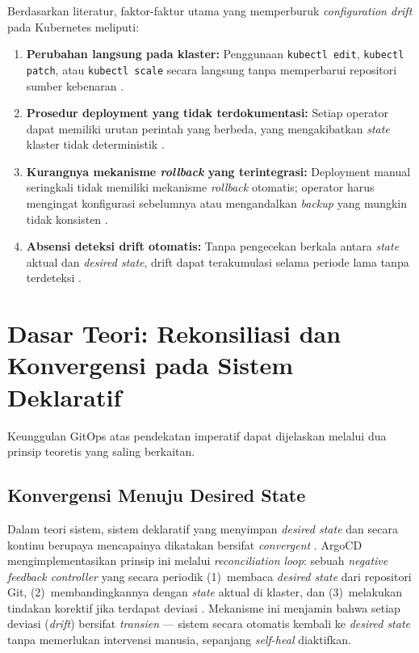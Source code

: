 Berdasarkan literatur, faktor-faktur utama yang memperburuk \textit{configuration drift} pada Kubernetes meliputi:

\begin{enumerate}
  \item \textbf{Perubahan langsung pada klaster:} Penggunaan \texttt{kubectl edit}, \texttt{kubectl patch}, atau \texttt{kubectl scale} secara langsung tanpa memperbarui repositori sumber kebenaran \citep{zhang2026configuration}.
  
  \item \textbf{Prosedur deployment yang tidak terdokumentasi:} Setiap operator dapat memiliki urutan perintah yang berbeda, yang mengakibatkan \textit{state} klaster tidak deterministik \citep{pohjola2025mitigating}.
  
  \item \textbf{Kurangnya mekanisme \textit{rollback} yang terintegrasi:} Deployment manual seringkali tidak memiliki mekanisme \textit{rollback} otomatis; operator harus mengingat konfigurasi sebelumnya atau mengandalkan \textit{backup} yang mungkin tidak konsisten \citep{rahman2023security}.
  
  \item \textbf{Absensi deteksi drift otomatis:} Tanpa pengecekan berkala antara \textit{state} aktual dan \textit{desired state}, drift dapat terakumulasi selama periode lama tanpa terdeteksi \citep{zhang2026configuration}.
\end{enumerate}

\section{Dasar Teori: Rekonsiliasi dan Konvergensi pada Sistem Deklaratif}

Keunggulan GitOps atas pendekatan imperatif dapat dijelaskan melalui dua prinsip teoretis yang saling berkaitan.

\subsection{Konvergensi Menuju Desired State}

Dalam teori sistem, sistem deklaratif yang menyimpan \textit{desired state} dan secara kontinu berupaya mencapainya dikatakan bersifat \textit{convergent} \citep{limoncelli2018}. ArgoCD mengimplementasikan prinsip ini melalui \textit{reconciliation loop}: sebuah \textit{negative feedback controller} yang secara periodik (1)~membaca \textit{desired state} dari repositori Git, (2)~membandingkannya dengan \textit{state} aktual di klaster, dan (3)~melakukan tindakan korektif jika terdapat deviasi \citep{argocd2024}. Mekanisme ini menjamin bahwa setiap deviasi (\textit{drift}) bersifat \textit{transien} --- sistem secara otomatis kembali ke \textit{desired state} tanpa memerlukan intervensi manusia, sepanjang \textit{self-heal} diaktifkan.

